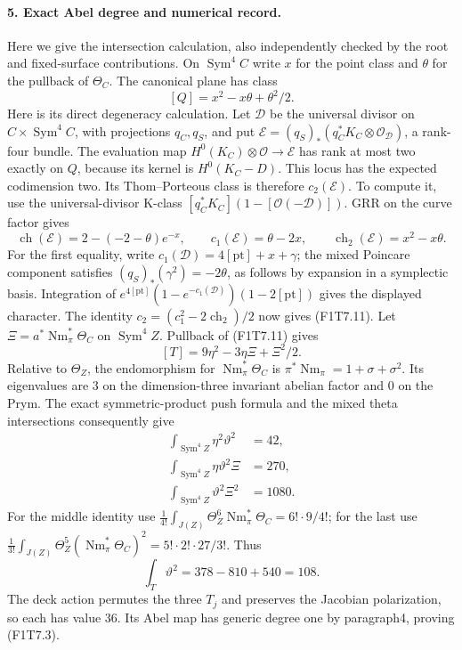 \paragraph{5. Exact Abel degree and numerical record.}
Here we give the intersection calculation, also independently
checked by the root and fixed-surface contributions.
On $\operatorname{Sym}^4C$ write $x$ for the point class
and $\theta$ for the pullback of $\Theta_C$. The canonical
plane has class
\[
                         [Q]=x^2-x\theta+\theta^2/2.
 \tag{F1T7.11}
\]
Here is its direct degeneracy calculation. Let $\mathcal D$
be the universal divisor on
$C\times\operatorname{Sym}^4C$, with projections $q_C,q_S$,
and put
$\mathcal E=(q_S)_*(q_C^*K_C\otimes\mathcal O_{\mathcal D})$,
a rank-four bundle. The evaluation map
$H^0(K_C)\otimes\mathcal O\to\mathcal E$ has rank at most
two exactly on $Q$, because its kernel is $H^0(K_C-D)$.
This locus has the expected codimension two. Its
Thom--Porteous class is therefore $c_2(\mathcal E)$.
To compute it, use the universal-divisor K-class
$[q_C^*K_C](1-[\mathcal O(-\mathcal D)])$.
GRR on the curve factor gives
\[
 \operatorname{ch}(\mathcal E)
       =2-(-2-\theta)e^{-x},\qquad
 c_1(\mathcal E)=\theta-2x,\qquad
 \operatorname{ch}_2(\mathcal E)=x^2-x\theta.
\]
For the first equality, write
$c_1(\mathcal D)=4[\mathrm{pt}]+x+\gamma$;
the mixed Poincare component satisfies
$(q_S)_*(\gamma^2)=-2\theta$, as follows by expansion in
a symplectic basis. Integration of
$e^{4[\mathrm{pt}]}(1-e^{-c_1(\mathcal D)})
 (1-2[\mathrm{pt}])$ gives the displayed character.
The identity
$c_2=(c_1^2-2\operatorname{ch}_2)/2$ now gives (F1T7.11).
Let
$\Xi=a^*\operatorname{Nm}_\pi^*\Theta_C$ on
$\operatorname{Sym}^4Z$. Pullback of (F1T7.11) gives
\[
                         [T]=9\eta^2-3\eta\Xi+\Xi^2/2.
 \tag{F1T7.12}
\]
Relative to $\Theta_Z$, the endomorphism for
$\operatorname{Nm}_\pi^*\Theta_C$ is
$\pi^*\operatorname{Nm}_\pi=1+\sigma+\sigma^2$.
Its eigenvalues are $3$ on the dimension-three
invariant abelian factor and $0$ on the Prym.
The exact symmetric-product push formula and the
mixed theta intersections consequently give
\[
\begin{split}
 \int_{\operatorname{Sym}^4Z}\eta^2\vartheta^2&=42,\\
 \int_{\operatorname{Sym}^4Z}\eta\vartheta^2\Xi&=270,\\
 \int_{\operatorname{Sym}^4Z}\vartheta^2\Xi^2&=1080.
\end{split}
 \tag{F1T7.13}
\]
For the middle identity use
$\frac1{4!}\int_{J(Z)}\Theta_Z^6\operatorname{Nm}_\pi^*\Theta_C
=6!\cdot9/4!$; for the last use
$\frac1{3!}\int_{J(Z)}\Theta_Z^5
(\operatorname{Nm}_\pi^*\Theta_C)^2
=5!\cdot2!\cdot27/3!$.
Thus
\[
             \int_T\vartheta^2=378-810+540=108.
 \tag{F1T7.14}
\]
The deck action permutes the three $T_j$ and preserves
the Jacobian polarization, so each has value $36$.
Its Abel map has generic degree one by paragraph4,
proving (F1T7.3).

